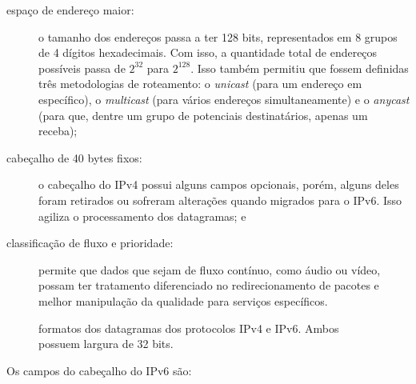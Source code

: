 \begin{description}
    \item[espaço de endereço maior:] o tamanho dos endereços passa a ter 128 bits,
        representados em 8 grupos de 4 dígitos hexadecimais. Com isso, a quantidade
        total de endereços possíveis passa de $2^{32}$ para $2^{128}$. Isso também
        permitiu que fossem definidas três metodologias de roteamento: o \emph{unicast}
        (para um endereço em específico), o \emph{multicast} (para vários endereços
        simultaneamente) e o \emph{anycast} (para que, dentre um grupo de potenciais
        destinatários, apenas um receba);

    \item[cabeçalho de 40 bytes fixos:] o cabeçalho do IPv4 possui alguns campos
        opcionais, porém, alguns deles foram retirados ou sofreram alterações quando
        migrados para o IPv6. Isso agiliza o processamento dos datagramas; e

    \item[classificação de fluxo e prioridade:] permite que dados que sejam de fluxo
        contínuo, como áudio ou vídeo, possam ter tratamento diferenciado no
        redirecionamento de pacotes e melhor manipulação da qualidade para serviços
        específicos.
\end{description}

\begin{figure}[H]
    \centering
    \caption{formatos dos datagramas dos protocolos IPv4 e IPv6. Ambos possuem largura de 32 bits.}
    \label{fig:headers}
\end{figure}

Os campos do cabeçalho do IPv6 são:


